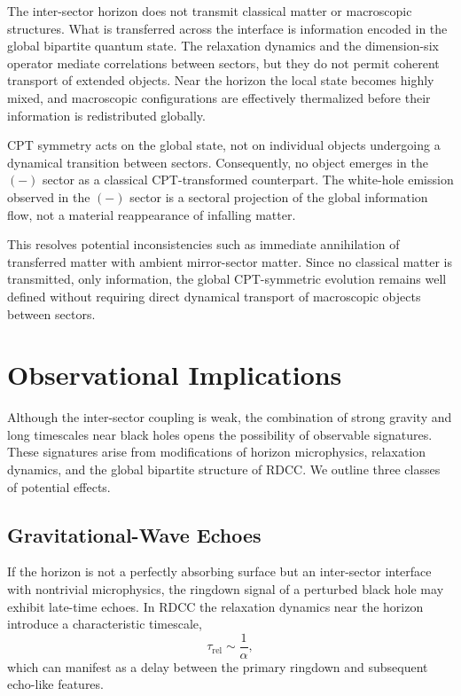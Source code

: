 \documentclass[11pt,a4paper]{article}
\begin{document}
The inter-sector horizon does not transmit classical matter or macroscopic structures.
What is transferred across the interface is information encoded in the global bipartite
quantum state. The relaxation dynamics and the dimension-six operator mediate
correlations between sectors, but they do not permit coherent transport of extended
objects. Near the horizon the local state becomes highly mixed, and macroscopic
configurations are effectively thermalized before their information is redistributed
globally.

CPT symmetry acts on the global state, not on individual objects undergoing a dynamical
transition between sectors. Consequently, no object emerges in the $(-)$ sector as a
classical CPT-transformed counterpart. The white-hole emission observed in the $(-)$
sector is a sectoral projection of the global information flow, not a material reappearance
of infalling matter.

This resolves potential inconsistencies such as immediate annihilation of transferred
matter with ambient mirror-sector matter. Since no classical matter is transmitted, only
information, the global CPT-symmetric evolution remains well defined without requiring
direct dynamical transport of macroscopic objects between sectors.


\section{Observational Implications}

Although the inter-sector coupling is weak, the combination of strong gravity and long
timescales near black holes opens the possibility of observable signatures. These signatures
arise from modifications of horizon microphysics, relaxation dynamics, and the global
bipartite structure of RDCC. We outline three classes of potential effects.


\subsection{Gravitational-Wave Echoes}

If the horizon is not a perfectly absorbing surface but an inter-sector interface with
nontrivial microphysics, the ringdown signal of a perturbed black hole may exhibit
late-time echoes. In RDCC the relaxation dynamics near the horizon introduce a
characteristic timescale,
\begin{equation}
\tau_{\mathrm{rel}} \sim \frac{1}{\alpha},
\end{equation}
which can manifest as a delay between the primary ringdown and subsequent echo-like
features.
\end{document}

